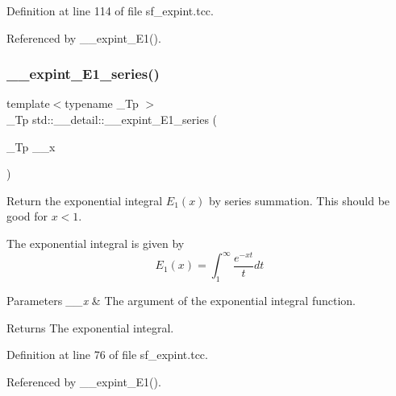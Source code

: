 Definition at line 114 of file sf\+\_\+expint.\+tcc.



Referenced by \+\_\+\+\_\+expint\+\_\+\+E1().

\mbox{\label{namespacestd_1_1____detail_ad162f66405bde5ccd5a7cdabbe1966f7}} 
\subsubsection{\texorpdfstring{\+\_\+\+\_\+expint\+\_\+\+E1\+\_\+series()}{\_\_expint\_E1\_series()}}
{\footnotesize\ttfamily template$<$typename \+\_\+\+Tp $>$ \\
\+\_\+\+Tp std\+::\+\_\+\+\_\+detail\+::\+\_\+\+\_\+expint\+\_\+\+E1\+\_\+series (\begin{DoxyParamCaption}\item[{\+\_\+\+Tp}]{\+\_\+\+\_\+x }\end{DoxyParamCaption})}



Return the exponential integral $ E_1(x) $ by series summation. This should be good for $ x < 1 $. 

The exponential integral is given by \[ E_1(x) = \int_{1}^{\infty} \frac{e^{-xt}}{t} dt \]


\begin{DoxyParams}{Parameters}
{\em \+\_\+\+\_\+x} & The argument of the exponential integral function. \\
\hline
\end{DoxyParams}
\begin{DoxyReturn}{Returns}
The exponential integral. 
\end{DoxyReturn}


Definition at line 76 of file sf\+\_\+expint.\+tcc.



Referenced by \+\_\+\+\_\+expint\+\_\+\+E1().

\mbox{\label{namespacestd_1_1____detail_ab2f8bf37caa4993de28306a2a634ed6f}} 
